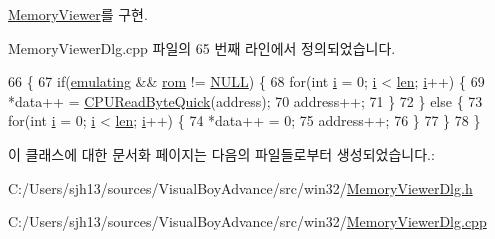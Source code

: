 \mbox{\hyperlink{class_memory_viewer_a2e1b969cce8f4d60912f6b640febc54a}{Memory\+Viewer}}를 구현.



Memory\+Viewer\+Dlg.\+cpp 파일의 65 번째 라인에서 정의되었습니다.


\begin{DoxyCode}
66 \{
67   \textcolor{keywordflow}{if}(\mbox{\hyperlink{_memory_viewer_dlg_8cpp_af9cc36078b1b311753963297ae7f2a74}{emulating}} && \mbox{\hyperlink{_globals_8cpp_adafc6ed627110c42f3893c9783f55320}{rom}} != \mbox{\hyperlink{getopt1_8c_a070d2ce7b6bb7e5c05602aa8c308d0c4}{NULL}}) \{
68     \textcolor{keywordflow}{for}(\textcolor{keywordtype}{int} \mbox{\hyperlink{expr-lex_8cpp_acb559820d9ca11295b4500f179ef6392}{i}} = 0; \mbox{\hyperlink{expr-lex_8cpp_acb559820d9ca11295b4500f179ef6392}{i}} < \mbox{\hyperlink{expr-lex_8cpp_afed088663f8704004425cdae2120b9b3}{len}}; \mbox{\hyperlink{expr-lex_8cpp_acb559820d9ca11295b4500f179ef6392}{i}}++) \{
69       *data++ = \mbox{\hyperlink{_memory_viewer_dlg_8cpp_ab9d417f7a58507a4fd4a574eb00d7106}{CPUReadByteQuick}}(address);
70       address++;
71     \}
72   \} \textcolor{keywordflow}{else} \{
73     \textcolor{keywordflow}{for}(\textcolor{keywordtype}{int} \mbox{\hyperlink{expr-lex_8cpp_acb559820d9ca11295b4500f179ef6392}{i}} = 0; \mbox{\hyperlink{expr-lex_8cpp_acb559820d9ca11295b4500f179ef6392}{i}} < \mbox{\hyperlink{expr-lex_8cpp_afed088663f8704004425cdae2120b9b3}{len}}; \mbox{\hyperlink{expr-lex_8cpp_acb559820d9ca11295b4500f179ef6392}{i}}++) \{
74       *data++ = 0;
75       address++;
76     \}    
77   \}
78 \}
\end{DoxyCode}


이 클래스에 대한 문서화 페이지는 다음의 파일들로부터 생성되었습니다.\+:\begin{DoxyCompactItemize}
\item 
C\+:/\+Users/sjh13/sources/\+Visual\+Boy\+Advance/src/win32/\mbox{\hyperlink{_memory_viewer_dlg_8h}{Memory\+Viewer\+Dlg.\+h}}\item 
C\+:/\+Users/sjh13/sources/\+Visual\+Boy\+Advance/src/win32/\mbox{\hyperlink{_memory_viewer_dlg_8cpp}{Memory\+Viewer\+Dlg.\+cpp}}\end{DoxyCompactItemize}
